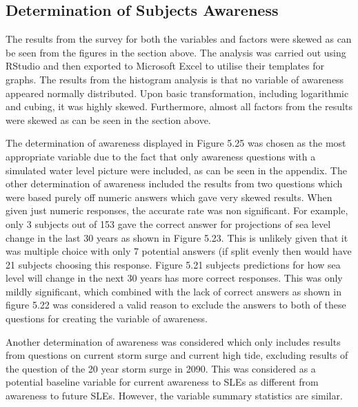 \paragraph{}





\subsection{Determination of Subjects Awareness}
The results from the survey for both the variables and factors were skewed as can be seen from the figures in the section above. The analysis was carried out using RStudio and then exported to Microsoft Excel to utilise their templates for graphs. The results from the histogram analysis is that no variable of awareness appeared normally distributed. Upon basic transformation, including logarithmic and cubing, it was highly skewed. Furthermore, almost all factors from the results were skewed as can be seen in the section above. 

The determination of awareness displayed in Figure 5.25 was chosen as the most appropriate variable due to the fact that only awareness questions with a simulated water level picture were included, as can be seen in the appendix. The other determination of awareness included the results from two questions which were based purely off numeric answers which gave very skewed results. When given just numeric responses, the accurate rate was non significant. For example, only 3 subjects out of 153 gave the correct answer for projections of sea level change in the last 30 years as shown in Figure 5.23.  This is unlikely given that it was multiple choice with only 7 potential answers (if split evenly then would have 21 subjects choosing this response. Figure 5.21 subjects predictions for how sea level will change in the next 30 years has more correct responses. This was only mildly significant, which combined with the lack of correct answers as shown in figure 5.22 was considered a valid reason to exclude the answers to both of these questions for creating the variable of awareness. 


Another determination of awareness was considered which only includes results from questions on current storm surge and current high tide, excluding results of the question of the 20 year storm surge in 2090. This was considered as a potential baseline variable for current awareness to SLEs as different from awareness to future SLEs. However, the variable summary statistics are similar.

